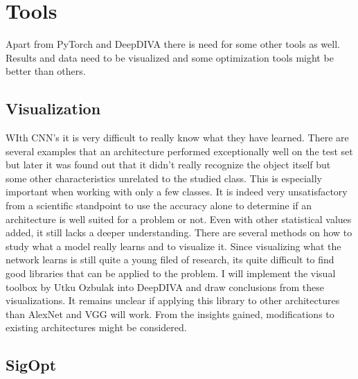 \section{Tools}

Apart from PyTorch and DeepDIVA there is need for some other tools as well. Results and data need to be visualized and some optimization tools might be better than others.

\subsection{Visualization}

WIth CNN's it is very difficult to really know what they have learned. There are several examples that an architecture performed exceptionally well on the test set but later it was found out that it didn't really recognize the object itself but some other characteristics unrelated to the studied class. This is especially important when working with only a few classes. It is indeed very unsatisfactory from a scientific standpoint to use the accuracy alone to determine if an architecture is well suited for a problem or not. Even with other statistical values added, it still lacks a deeper understanding. There are several methods on how to study what a model really learns and to visualize it. Since visualizing what the network learns is still quite a young filed of research, its quite difficult to find good libraries that can be applied to the problem. I will implement the visual toolbox by Utku Ozbulak \cite{viztoolbox} into DeepDIVA and draw conclusions from these visualizations. It remains unclear if applying this library to other architectures than AlexNet and VGG will work. From the insights gained, modifications to existing architectures might be considered. 

\subsection{SigOpt}

